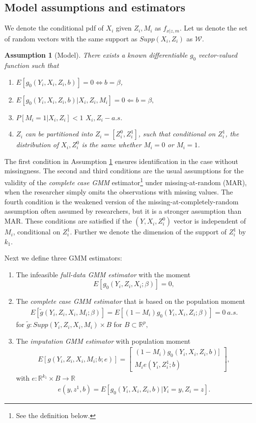 \documentclass{article}
\newtheorem{assumption}{Assumption}
\theoremstyle{definition}
\theoremstyle{remark}
\begin{document}
\subsection{Model assumptions and estimators}
We denote the conditional pdf of $X_i$ given $Z_i, M_i$ as $f_{x|z,m}$. Let us denote the set of random vectors with the same support as $Supp(X_i,Z_i)$ as $\mathcal{W}$.
\begin{assumption}[Model] \label{ass_model}
There exists a known differentiable $g_0$ vector-valued function such that
\begin{enumerate}
\item $E[g_0(Y_i,X_i, Z_i, b)] = 0 \iff b=\beta$,
\item $E[g_0(Y_i, X_i, Z_i, b)|X_i, Z_i, M_i] = 0 \Leftarrow b=\beta,$
\item $P[M_i=1|X_i,Z_i]<1$ $X_i,Z_i-a.s.$
\item $Z_i$ can be partitioned into $Z_i= [Z^0_i, Z^1_i]$, such that conditional on $Z_i^1$, the distribution of $X_i, Z^0_i$ is the same whether $M_i=0$ or $M_i=1$.
\end{enumerate}
\end{assumption}
The first condition in Assumption \ref{ass_model} ensures identification in the case without missingness. The second and third conditions are the usual assumptions for the validity of the \textit{complete case GMM} estimator\footnote{See the definition below.} under missing-at-random (MAR), when the researcher simply omits the observations with missing values. The fourth condition is the weakened version of the missing-at-completely-random assumption often assumed by researchers, but it is a stronger assumption than MAR. These conditions are satisfied if the $(Y,X_i,Z^0_i)$ vector is independent of $M_i$, conditional on $Z_i^1$. Further we denote the dimension of the support of $Z^1_i$ by $k_1$.

Next we define three GMM estimators: 
\begin{enumerate}
	\item The infeasible \emph{full-data GMM estimator} with the moment
	\[E[g_0(Y_i, Z_i, X_i; \beta)]=0,
	\]
	\item The \emph{complete case GMM estimator} that is based on the population moment
	\begin{align}
	E[\tilde{g}(Y_i, Z_i, X_i, M_i; \beta)] = E\left[(1-M_i) g_0(Y_i, X_i,Z_i; \beta )\right]=0 \ a.s.
	\end{align}
	for $\tilde{g}: Supp(Y_i, Z_i, X_i, M_i) \times B$ for $B \subset \mathbb{R}^p,$
	\item The \emph{imputation GMM estimator} with population moment
	\begin{align}
	E[g(Y_i,Z_i,X_i,M_i; b; e)]=\left[\begin{array}{c}
	(1-M_i) g_0(Y_i,X_i,Z_i,b)]\\
	M_i e(Y_i, Z_i^1; b)
	\end{array}\right],
	\end{align}
	with $e: \mathbb{R}^{k_1}\times B \rightarrow \mathbb{R}$
	\begin{align}
	e(y, z^1,b)= E[g_0(Y_i, X_i,Z_i, b)|Y_i=y, Z_i=z].
	\end{align}
\end{enumerate}
\end{document}
